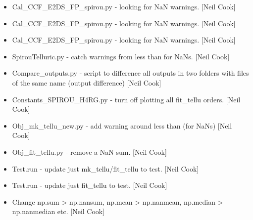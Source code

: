 \documentclass[a4paper,10pt,english]{report}
\begin{document}
\begin{itemize}
\item {} 
Cal\_CCF\_E2DS\_FP\_spirou.py - looking for NaN warnings. {[}Neil Cook{]}

\item {} 
Cal\_CCF\_E2DS\_FP\_spirou.py - looking for NaN warnings. {[}Neil Cook{]}

\item {} 
Cal\_CCF\_E2DS\_FP\_spirou.py - looking for NaN warnings. {[}Neil Cook{]}

\item {} 
SpirouTelluric.py - catch warnings from less than for NaNs. {[}Neil
Cook{]}

\item {} 
Compare\_outputs.py - script to difference all outputs in two folders
with files of the same name (output difference) {[}Neil Cook{]}

\item {} 
Constants\_SPIROU\_H4RG.py - turn off plotting all fit\_tellu orders.
{[}Neil Cook{]}

\item {} 
Obj\_mk\_tellu\_new.py - add warning around less than (for NaNs) {[}Neil
Cook{]}

\item {} 
Obj\_fit\_tellu.py - remove a NaN sum. {[}Neil Cook{]}

\item {} 
Test.run - update just mk\_tellu/fit\_tellu to test. {[}Neil Cook{]}

\item {} 
Test.run - update just fit\_tellu to test. {[}Neil Cook{]}

\item {} 
Change np.sum \textendash{}\textgreater{} np.nansum, np.mean \textendash{}\textgreater{} np.nanmean, np.median \textendash{}\textgreater{}
np.nanmedian etc. {[}Neil Cook{]}

\end{itemize}
\end{document}
